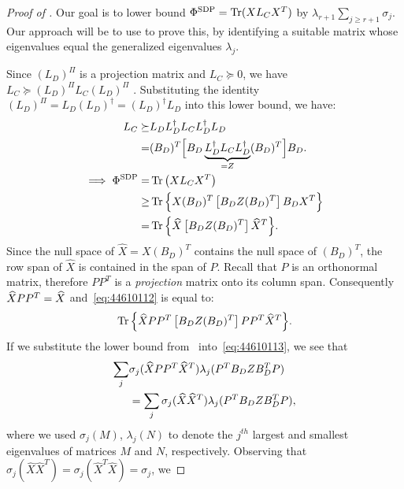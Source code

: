 \documentclass{article}
\DeclareMathOperator{\tr}{Tr}
\newcommand{\vnote}[1]{}
\begin{document}
\begin{proof}[Proof of ]
Our goal is to lower bound $\scsdp = \tr(X L_C X^T)$ by $\lambda_{r+1}
\sum_{j \ge r+1} \sigma_j$.  Our approach will be to use
 to prove this, by identifying a suitable matrix
whose eigenvalues equal the generalized eigenvalues $\lambda_j$.
		
Since $(L_D)^{\Pi}$ is a projection matrix and $L_C \succeq 0$, we
have $L_C \succeq (L_D)^{\Pi} L_C (L_D)^{\Pi}$ .  Substituting the
identity $(L_D)^{\Pi} = L_D (L_D)^{\dagger}= (L_D)^{\dagger} L_D$ into
this lower bound, we have:
\begin{align}
  L_C \succeq & L_D L_D^{\dagger} L_C L_D^{\dagger} L_D  \notag \\
  = & (B_D)^T \Big[B_D \underbrace{L_D^{\dagger} L_C L_D^{\dagger}}_{=
    Z}
  (B_D)^T\Big] B_D. \notag\\
  \implies \scsdp =& \tr\left( \xmat L_C \xmat^T \right) \notag\\
  \ge & \tr\Big\{ \xmat (B_D)^T \left[B_D Z (B_D)^T\right] B_D
  \xmat^T \Big\} \notag \\
  = & \tr\Big\{ \widehat{\xmat} \left[B_D Z (B_D)^T\right]
  \widehat{\xmat}^T\Big\} .\label{eq:44610112}
\end{align}
Since the null space of $\widehat{X} = X (B_D)^T$ contains the null
space of $(B_D)^T$, the row span of $\widehat{X}$ is contained in the
span of $P$. Recall that $P$ is an orthonormal matrix, therefore $P
P^T$ is a {\em projection} matrix onto its column span. Consequently
$\widehat{\xmat} P P^T = \widehat{\xmat}$ and~\cref{eq:44610112} is
equal to: \vnote{It might be good to remind reader of relation between
  SVD and null space and justify $\widehat{\xmat} P P^T =
  \widehat{\xmat}$.}
\begin{equation}
  \tr\Big\{ \widehat{\xmat} P P^T \left[B_D Z (B_D)^T\right] 
  P P^T\widehat{\xmat}^T\Big\}.
\label{eq:44610113}
\end{equation}
If we substitute the lower bound from~
into~\cref{eq:44610113}, we see that
\begin{align*}
  \sum_j & \sigma_j (\widehat{{X}} P P^T \widehat{{X}}^T) 
  \lambda_j(P^T B_D Z B_D^T P)  \\
  & = \sum_j \sigma_j (\widehat{{X}} \widehat{{X}}^T)
  \lambda_j(P^T B_D Z B_D^T P),
\end{align*}
where we used $\sigma_j(M)$, $\lambda_j(N)$ to denote the $j^{th}$
largest and smallest eigenvalues of matrices $M$ and $N$,
respectively.  Observing that $\sigma_j(\widehat{X}
\widehat{X}^T)=\sigma_j(\widehat{X}^T \widehat{X}) = \sigma_j$, we

\end{proof}
\end{document}
